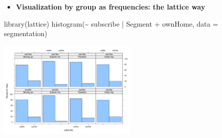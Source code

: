 \documentclass[
  ignorenonframetext,
]{beamer}
\newenvironment{Shaded}{\begin{snugshade}}{\end{snugshade}}
\newcommand{\AttributeTok}[1]{\textcolor[rgb]{0.40,0.45,0.13}{#1}}
\newcommand{\FunctionTok}[1]{\textcolor[rgb]{0.28,0.35,0.67}{#1}}
\newcommand{\NormalTok}[1]{\textcolor[rgb]{0.00,0.23,0.31}{#1}}
\newcommand{\SpecialCharTok}[1]{\textcolor[rgb]{0.37,0.37,0.37}{#1}}
\providecommand{\tightlist}{%
  \setlength{\itemsep}{0pt}\setlength{\parskip}{0pt}}\usepackage{longtable,booktabs,array}
\begin{document}
\begin{frame}[fragile]{}
\label{section-12}
\begin{itemize}
\tightlist
\item
  \textbf{Visualization by group as frequencies: the lattice way}
\end{itemize}

\tiny

\begin{Shaded}
\begin{Highlighting}[]
\FunctionTok{library}\NormalTok{(lattice)}
\FunctionTok{histogram}\NormalTok{(}\SpecialCharTok{\textasciitilde{}}\NormalTok{ subscribe }\SpecialCharTok{|}\NormalTok{ Segment }\SpecialCharTok{+}\NormalTok{ ownHome, }\AttributeTok{data =}\NormalTok{ segmentation)}
\end{Highlighting}
\end{Shaded}

\begin{center}
\includegraphics[width=0.5\textwidth,height=\textheight]{005_comparing_groups_tables_and_visualizations_files/figure-beamer/unnamed-chunk-10-1.pdf}
\end{center}
\end{frame}
\end{document}

